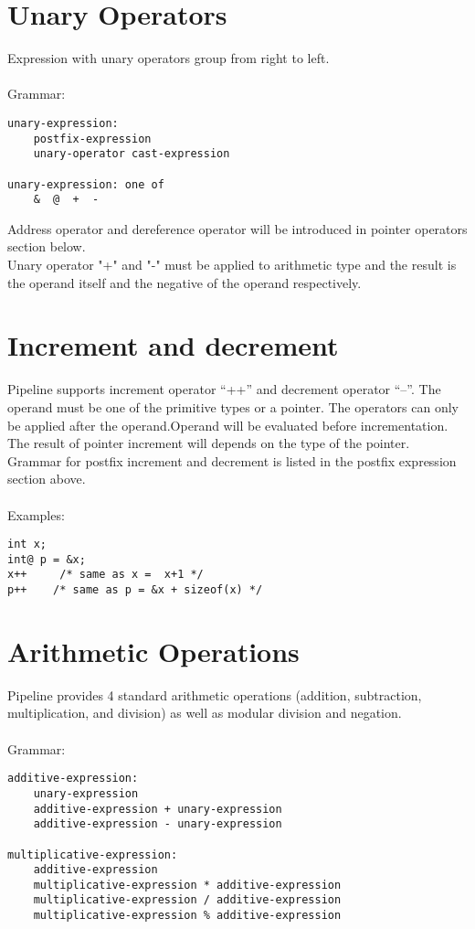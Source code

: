\documentclass[./LRM_main.tex]{subfiles}
\begin{document}
\section{Unary Operators}
Expression with unary operators group from right to left.\\
\vspace{1 mm}\\
Grammar:
\begin{lstlisting}
unary-expression:
    postfix-expression
    unary-operator cast-expression
    
unary-expression: one of
    &  @  +  -
\end{lstlisting}
Address operator and dereference operator will be introduced in pointer operators section below.\\
Unary operator "+" and "-" must be applied to arithmetic type and the result is the operand itself and the negative of the operand respectively.\\
\section{Increment and decrement}
Pipeline supports increment operator “++” and  decrement operator “--”. The operand must be one of the primitive types or a pointer. The operators can only be applied after the operand.Operand will be evaluated before incrementation.\\
The result of pointer increment will depends on the type of the pointer.\\
Grammar for postfix increment and decrement is listed in the postfix expression section above.\\
\vspace{1 mm}\\
Examples:
\begin{lstlisting}
int x;
int@ p = &x;
x++     /* same as x =  x+1 */
p++    /* same as p = &x + sizeof(x) */ 
\end{lstlisting}
\section{Arithmetic Operations}
Pipeline provides 4 standard arithmetic operations (addition, subtraction, multiplication, and division) as well as modular division and negation.\\
\vspace{1 mm}\\
Grammar:
\begin{lstlisting}
additive-expression:
    unary-expression
    additive-expression + unary-expression
    additive-expression - unary-expression

multiplicative-expression:
    additive-expression
    multiplicative-expression * additive-expression
    multiplicative-expression / additive-expression
    multiplicative-expression % additive-expression
\end{lstlisting}
\end{document}
